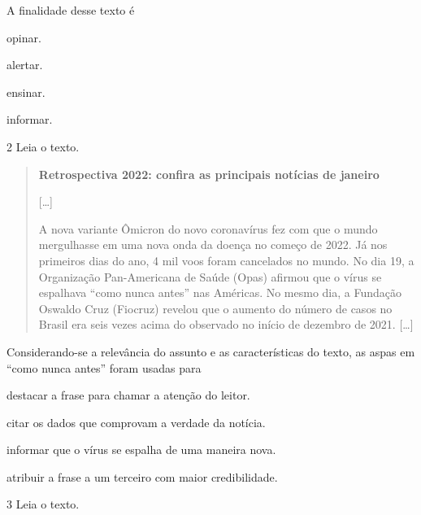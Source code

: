 A finalidade desse texto é

\begin{escolha}
\item opinar.

\item alertar.

\item ensinar.

\item informar.
\end{escolha}

\num{2} Leia o texto.

\begin{quote}
\textbf{Retrospectiva 2022: confira as principais notícias de janeiro}

{[}\ldots{]}

A nova variante Ômicron do novo coronavírus fez com que o mundo
mergulhasse em uma nova onda da doença no começo de 2022. Já nos
primeiros dias do ano, 4 mil voos foram cancelados no mundo. No dia 19,
a Organização Pan-Americana de Saúde (Opas) afirmou que o vírus se
espalhava ``como nunca antes'' nas Américas. No mesmo dia, a Fundação
Oswaldo Cruz (Fiocruz) revelou que o aumento do número de casos no
Brasil era seis vezes acima do observado no início de dezembro de 2021.
{[}\ldots{]}

\end{quote}

Considerando-se a relevância do assunto e as características do texto,
as aspas em ``como nunca antes'' foram usadas para

\begin{escolha}

\item destacar a frase para chamar a atenção do leitor. 
\item citar os dados que comprovam a verdade da notícia.
\item informar que o vírus se espalha de uma maneira nova.
\item atribuir a frase a um terceiro com maior credibilidade.
\end{escolha}

\num{3} Leia o texto.

